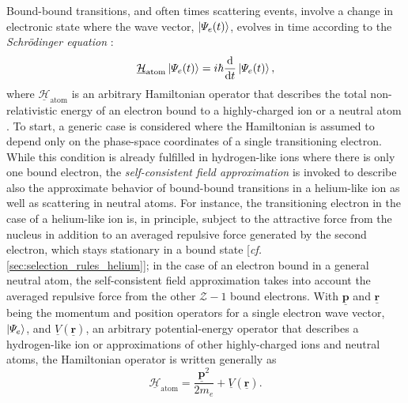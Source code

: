 Bound-bound transitions, and often times scattering events, involve a change in electronic state where the wave vector, $\ket{\Psi_e (t)}$, evolves in time according to the \emph{Schr\"odinger equation} \cite{Schrodinger1926}:
\begin{equation}\label{eq:Schrodinger_TD}
 \underline{\mathcal{H}}_{\text{atom}} \ket{\Psi_e (t)} = i \hbar \dv{t} \ket{\Psi_e (t)} ,
\end{equation}
where $\underline{\mathcal{H}}_{\text{atom}}$ is an arbitrary Hamiltonian operator that describes the total non-relativistic energy of an electron bound to a highly-charged ion or a neutral atom \cite{Griffiths05,Shankar04,Townsend00,Bethe57}. 
To start, a generic case is considered where the Hamiltonian is assumed to depend only on the phase-space coordinates of a single transitioning electron. 
While this condition is already fulfilled in hydrogen-like ions where there is only one bound electron, the \emph{self-consistent field approximation} \cite{Rybicki86} is invoked to describe also the approximate behavior of bound-bound transitions in a helium-like ion as well as scattering in neutral atoms. 
For instance, the transitioning electron in the case of a helium-like ion is, in principle, subject to the attractive force from the nucleus in addition to an averaged repulsive force generated by the second electron, which stays stationary in a bound state [\emph{cf.\@} \cref{sec:selection_rules_helium}]; in the case of an electron bound in a general neutral atom, the self-consistent field approximation takes into account the averaged repulsive force from the other $\mathcal{Z} - 1$ bound electrons. 
With $\underline{\mathbold{p}}$ and $\underline{\mathbold{r}}$ being the momentum and position operators for a single electron wave vector, $\ket{\Psi_e}$, and $\underline{V}(\underline{\mathbold{r}})$, an arbitrary potential-energy operator that describes a hydrogen-like ion or approximations of other highly-charged  ions and neutral atoms, the Hamiltonian operator is written generally as
\begin{equation}\label{eq:generic_ion_Hamiltonian}
 \underline{\mathcal{H}}_{\text{atom}} = \frac{\underline{\mathbold{p}}^2}{2 m_e} + \underline{V}(\underline{\mathbold{r}}) .
 \end{equation}

